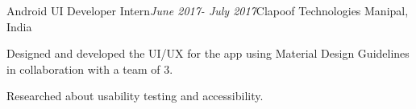 \begin{rSubsection}{Android UI Developer Intern}{\em June 2017- July 2017}{Clapoof Technologies}{ Manipal, India}
    \item Designed and developed the UI/UX for the app using Material Design Guidelines in collaboration with a team of 3.
    \item Researched about usability testing and accessibility.
\end{rSubsection}